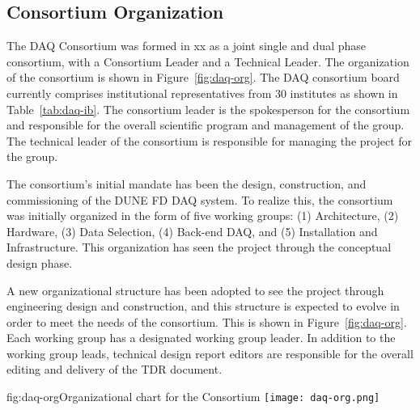 \subsection{Consortium Organization}

The DAQ Consortium was formed in xx as a joint single and
dual phase consortium, with a Consortium Leader and a Technical
Leader. The organization of the consortium is shown in
Figure~\ref{fig:daq-org}. The DAQ consortium board currently comprises
institutional representatives from 30 institutes as shown in Table~\ref{tab:daq-ib}. The consortium leader is the spokesperson for the consortium and
responsible for the overall scientific program and management of the
group. The technical leader of the consortium is responsible for
managing the project for the group.

The consortium's initial mandate has been the design, construction,
and commissioning 
of the DUNE FD DAQ system. To realize this, the consortium was
initially organized in the form of five working groups: (1)
Architecture, (2) Hardware, (3) Data Selection, (4) Back-end DAQ, and (5)
Installation and Infrastructure. This organization has seen the
project through the conceptual design phase.  

A new organizational
structure has been adopted to see the project through engineering
design and construction, and this structure is expected to evolve in
order to meet the needs of the consortium. This is shown in Figure~\ref{fig:daq-org}. Each working group has a designated working group
leader. In addition to the
working group leads, technical design report editors are responsible for the
overall editing and delivery of the TDR document.

\begin{dunefigure}{fig:daq-org}{Organizational chart for the  Consortium
 }
  \texttt{[image: daq-org.png]}
\end{dunefigure}

